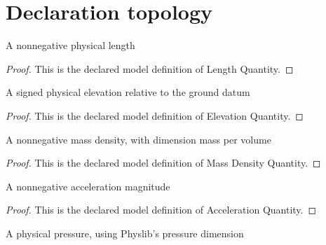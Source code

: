 \section{Declaration topology}
\begin{definition}
  \label{def:physics:phyx-mini-0394:phyxminiproblems-problemphyxmini0394-lengthquantity}
  A nonnegative physical length
\end{definition}
\begin{proof}
  This is the declared model definition of Length Quantity.
\end{proof}
\begin{definition}
  \label{def:physics:phyx-mini-0394:phyxminiproblems-problemphyxmini0394-elevationquantity}
  A signed physical elevation relative to the ground datum
\end{definition}
\begin{proof}
  This is the declared model definition of Elevation Quantity.
\end{proof}
\begin{definition}
  \label{def:physics:phyx-mini-0394:phyxminiproblems-problemphyxmini0394-massdensityquantity}
  A nonnegative mass density, with dimension mass per volume
\end{definition}
\begin{proof}
  This is the declared model definition of Mass Density Quantity.
\end{proof}
\begin{definition}
  \label{def:physics:phyx-mini-0394:phyxminiproblems-problemphyxmini0394-accelerationquantity}
  A nonnegative acceleration magnitude
\end{definition}
\begin{proof}
  This is the declared model definition of Acceleration Quantity.
\end{proof}
\begin{definition}
  \label{def:physics:phyx-mini-0394:phyxminiproblems-problemphyxmini0394-pressurequantity}
  A physical pressure, using Physlib's pressure dimension
\end{definition}
